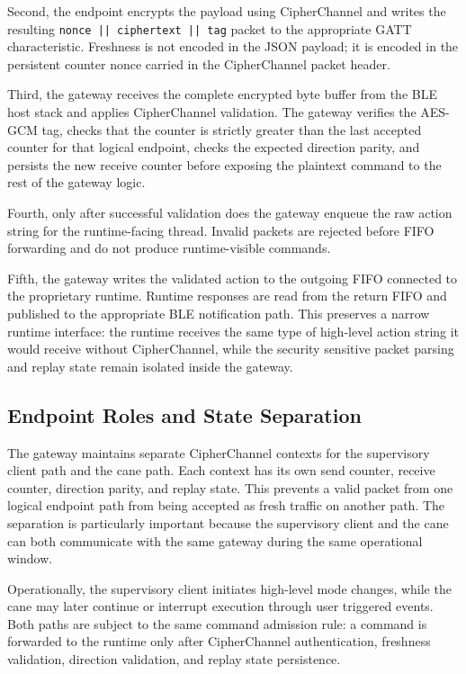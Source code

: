 \documentclass[journal]{IEEEtran}
\begin{document}
Second, the endpoint encrypts the payload using CipherChannel and writes the resulting \texttt{nonce || ciphertext || tag} packet to the appropriate GATT characteristic. Freshness is not encoded in the JSON payload; it is encoded in the persistent counter nonce carried in the CipherChannel packet header.

Third, the gateway receives the complete encrypted byte buffer from the BLE host stack and applies CipherChannel validation. The gateway verifies the AES-GCM tag, checks that the counter is strictly greater than the last accepted counter for that logical endpoint, checks the expected direction parity, and persists
the new receive counter before exposing the plaintext command to the rest of the gateway logic.

Fourth, only after successful validation does the gateway enqueue the raw action string for the runtime-facing thread. Invalid packets are rejected before FIFO forwarding and do not produce runtime-visible commands.

Fifth, the gateway writes the validated action to the outgoing FIFO connected to the proprietary runtime. Runtime responses are read from the return FIFO and published to the appropriate BLE notification path. This preserves a narrow runtime interface: the runtime receives the same type of high-level action string it would receive without CipherChannel, while the security sensitive packet parsing and replay state remain isolated inside the gateway.


\subsection{Endpoint Roles and State Separation}

The gateway maintains separate CipherChannel contexts for the supervisory client path and the cane path. Each context has its own send counter, receive counter, direction parity, and replay state. This prevents a valid packet from one logical endpoint path from being accepted as fresh traffic on another path. The separation is particularly important because the supervisory client and the cane can both communicate with the same gateway during the same operational window.

Operationally, the supervisory client initiates high-level mode changes, while the cane may later continue or interrupt execution through user triggered events. Both paths are subject to the same command admission rule: a command is forwarded to the runtime only after CipherChannel authentication, freshness validation, direction validation, and replay state persistence.
\end{document}
